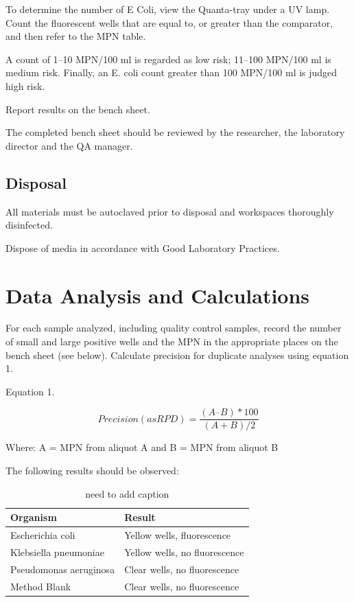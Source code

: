 \documentclass[12pt]{../SOP4_alpha}\usepackage[]{graphicx}\usepackage[]{xcolor}
\begin{document}
\NP To determine the number of E Coli, view the Quanta-tray under a UV lamp. Count the fluorescent wells that are equal to, or greater than the comparator, and then refer to the MPN table.

\NP A count of 1–10 MPN/100 ml is regarded as low risk; 11–100 MPN/100 ml is medium risk. Finally, an E. coli count greater than 100 MPN/100 ml is judged high risk.


\NP Report results on the bench sheet.

\NP The completed bench sheet should be reviewed by the researcher, the
laboratory director and the QA manager. 

\subsection{Disposal}


\NP All materials must be autoclaved prior to disposal and workspaces
thoroughly disinfected.

\NP Dispose of media in accordance with Good Laboratory Practices.

\section{Data Analysis and Calculations}

\NP For each sample analyzed, including quality control samples, record
the number of small and large positive wells and the MPN in the
appropriate places on the bench sheet (see below). Calculate
precision for duplicate analyses using equation 1.

\NP Equation 1. 

\begin{equation}
Precision (as RPD) = \frac{(A – B)*100}{(A + B)/2}
\end{equation}

Where: A = MPN from aliquot A and
 B = MPN from aliquot B 
 
 

\NP The following results should be observed:


\begin{table}
\caption{need to add caption}
		\begin{tabular}{ll}\hline

Organism                &  Result \\ \hline \hline
Escherichia coli        & Yellow wells, fluorescence \\
Klebsiella pneumoniae   & Yellow wells, no fluorescence \\
Pseudomonas aeruginosa  & Clear wells, no fluorescence \\
Method Blank            & Clear wells, no fluorescence \\ \hline
  \end{tabular}
\end{table}
\end{document}
